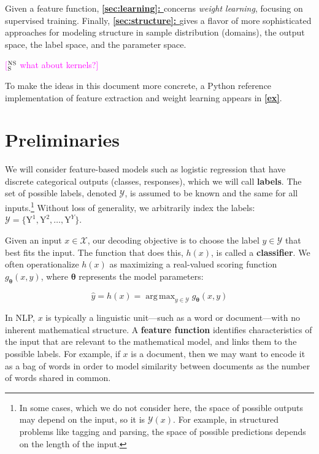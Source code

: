 \documentclass[11pt,letterpaper]{article}
\DeclareMathOperator*{\argmax}{arg\,max}
\newcommand{\ensuretext}[1]{#1}
\newcommand{\nssmarker}{\ensuretext{\textcolor{magenta}{\ensuremath{^{\textsc{NS}}_{\textsc{S}}}}}}
\newcommand{\arkcomment}[3]{\ensuretext{\textcolor{#3}{[#1 #2]}}}
\newcommand{\nss}[1]{\arkcomment{\nssmarker}{#1}{magenta}}
\newcommand{\params}{\mathbf{\theta}}
\newcommand*{\fullref}[1]{\hyperref[{#1}]{\cref*{#1}: \nameref{#1}}}
\newcommand{\futureversion}[1]{}
\begin{document}
Given a feature function, {\bf \fullref{sec:learning}} concerns {\em weight learning}, 
focusing on supervised training.\futureversion{\nss{{\bf \fullref{sec:interp}} discusses the insights that can be gained 
from examining learned model weights.}}
Finally, {\bf \fullref{sec:structure}} gives a flavor of more sophisticated approaches 
for modeling structure in sample distribution (domains), 
the output space, the label space, and the parameter space. 

\nss{what about kernels?}

To make the ideas in this document more concrete, 
a Python reference implementation of feature extraction and weight learning
appears in {\bf \cref{ex}}.

\section{Preliminaries}\label{sec:prelim}

We will consider feature-based models such as logistic regression 
that have discrete categorical outputs (classes, responses), which we will call {\bf labels}. 
The set of possible labels, denoted $\mathcal{Y}$, is assumed to be known and the same for all inputs.\footnote{In some cases, which we do not consider here, the space of possible outputs may depend on the input, so it is $\mathcal{Y}(x)$. 
For example, in structured problems like tagging and parsing, the space of possible predictions depends on the length of the input.}
Without loss of generality, we arbitrarily index the labels: $\mathcal{Y}=\{\mathrm{Y}^1,\mathrm{Y}^2,\ldots,\mathrm{Y}^{Y}\}$.

Given an input $x \in \mathcal{X}$, our decoding objective is 
to choose the label $y \in \mathcal{Y}$ that best fits the input. 
The function that does this, $h(x)$, is called a \textbf{classifier}.
We often operationalize $h(x)$ as maximizing a real-valued scoring function $g_\params(x,y)$, 
where $\params$ represents the model parameters: 

\begin{equation}\label{eq:classifier}
\hat{y} = h(x) = \argmax_{y\in\mathcal{Y}} g_\params(x,y)
\end{equation}

In NLP, $x$ is typically a linguistic unit---such as a word or document---with no inherent mathematical structure. 
A {\bf feature function} identifies characteristics of the input that are relevant to the mathematical model, 
and links them to the possible labels. 
For example, if $x$ is a document, then we may want to encode it as a bag of words 
in order to model similarity between documents as the number of words shared in common.
\end{document}
